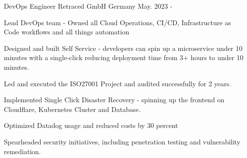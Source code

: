 

\begin{cventries}

  \cventry
    { DevOps Engineer } %
    {Retraced GmbH} %
    {Germany} %
    {May. 2023 - } %
    {
      \begin{cvitems} %
        \item {Lead DevOps team - Owned all Cloud Operations, CI/CD, Infrastructure as Code workflows and all things automation}
        \item {Designed and built Self Service - developers can spin up a microservice under 10 minutes with a single-click reducing deployment time from 3+ hours to under 10 minutes.}
        \item {Led and executed the ISO27001 Project and audited successfully for 2 years.}
        \item {Implemented Single Click Disaster Recovery - spinning up the frontend on Cloudflare, Kubernetes Cluster and Database. }
        \item {Optimized Datadog usage and reduced costs by 30 percent }
        \item {Spearheaded security initiatives, including penetration testing and vulnerability remediation.}
      \end{cvitems}
    }


\end{cventries}
